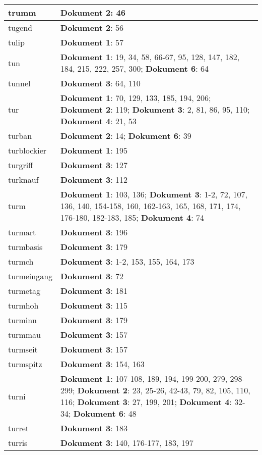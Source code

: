 \documentclass[a5paper]{article}
\begin{document}
\begin{longtable}[l]{|l|p{3in}|}
\hline
trumm & \textbf{Dokument 2}: 46 \\
\hline
tugend & \textbf{Dokument 2}: 56 \\
\hline
tulip & \textbf{Dokument 1}: 57 \\
\hline
tun & \textbf{Dokument 1}: 19, 34, 58, 66-67, 95, 128, 147, 182, 184, 215, 222, 257, 300; \textbf{Dokument 6}: 64 \\
\hline
tunnel & \textbf{Dokument 3}: 64, 110 \\
\hline
tur & \textbf{Dokument 1}: 70, 129, 133, 185, 194, 206; \textbf{Dokument 2}: 119; \textbf{Dokument 3}: 2, 81, 86, 95, 110; \textbf{Dokument 4}: 21, 53 \\
\hline
turban & \textbf{Dokument 2}: 14; \textbf{Dokument 6}: 39 \\
\hline
turblockier & \textbf{Dokument 1}: 195 \\
\hline
turgriff & \textbf{Dokument 3}: 127 \\
\hline
turknauf & \textbf{Dokument 3}: 112 \\
\hline
turm & \textbf{Dokument 1}: 103, 136; \textbf{Dokument 3}: 1-2, 72, 107, 136, 140, 154-158, 160, 162-163, 165, 168, 171, 174, 176-180, 182-183, 185; \textbf{Dokument 4}: 74 \\
\hline
turmart & \textbf{Dokument 3}: 196 \\
\hline
turmbasis & \textbf{Dokument 3}: 179 \\
\hline
turmch & \textbf{Dokument 3}: 1-2, 153, 155, 164, 173 \\
\hline
turmeingang & \textbf{Dokument 3}: 72 \\
\hline
turmetag & \textbf{Dokument 3}: 181 \\
\hline
turmhoh & \textbf{Dokument 3}: 115 \\
\hline
turminn & \textbf{Dokument 3}: 179 \\
\hline
turmmau & \textbf{Dokument 3}: 157 \\
\hline
turmseit & \textbf{Dokument 3}: 157 \\
\hline
turmspitz & \textbf{Dokument 3}: 154, 163 \\
\hline
turni & \textbf{Dokument 1}: 107-108, 189, 194, 199-200, 279, 298-299; \textbf{Dokument 2}: 23, 25-26, 42-43, 79, 82, 105, 110, 116; \textbf{Dokument 3}: 27, 199, 201; \textbf{Dokument 4}: 32-34; \textbf{Dokument 6}: 48 \\
\hline
turret & \textbf{Dokument 3}: 183 \\
\hline
turris & \textbf{Dokument 3}: 140, 176-177, 183, 197 \\

\end{longtable}
\end{document}
